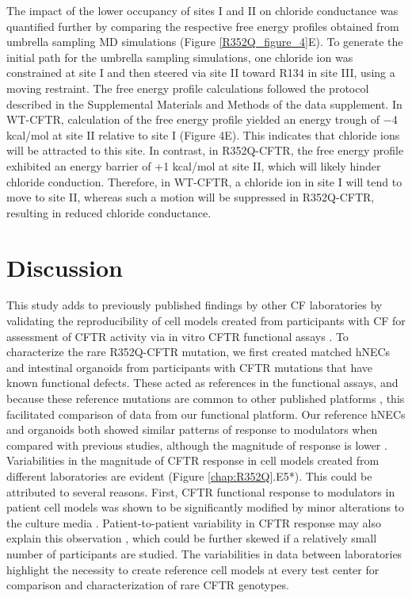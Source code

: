The impact of the lower occupancy of sites I and II on chloride conductance was quantified further by comparing the respective free energy profiles obtained from umbrella sampling MD simulations (Figure \ref{R352Q_figure_4}E). To generate the initial path for the umbrella sampling simulations, one chloride ion was constrained at site I and then steered via site II toward R134 in site III, using a moving restraint. The free energy profile calculations followed the protocol described in the Supplemental Materials and Methods of the data supplement. In WT-CFTR, calculation of the free energy profile yielded an energy trough of −4 kcal/mol at site II relative to site I (Figure 4E). This indicates that chloride ions will be attracted to this site. In contrast, in R352Q-CFTR, the free energy profile exhibited an energy barrier of +1 kcal/mol at site II, which will likely hinder chloride conduction. Therefore, in WT-CFTR, a chloride ion in site I will tend to move to site II, whereas such a motion will be suppressed in R352Q-CFTR, resulting in reduced chloride conductance.

\section{Discussion}
This study adds to previously published findings by other CF laboratories by validating the reproducibility of cell models created from participants with CF for assessment of CFTR activity via in vitro CFTR functional assays \cite{dekkers2016, ramalho2021}. To characterize the rare R352Q-CFTR mutation, we first created matched hNECs and intestinal organoids from participants with CFTR mutations that have known functional defects. These acted as references in the functional assays, and because these reference mutations are common to other published platforms \cite{dekkers2016, ramalho2021}, this facilitated comparison of data from our functional platform. Our reference hNECs and organoids both showed similar patterns of response to modulators when compared with previous studies, although the magnitude of response is lower \cite{dekkers2016, ramalho2021, pranke2017, pranke2019a}. Variabilities in the magnitude of CFTR response in cell models created from different laboratories are evident (Figure \ref{chap:R352Q}.E5*). This could be attributed to several reasons. First, CFTR functional response to modulators in patient cell models was shown to be significantly modified by minor alterations to the culture media \cite{gentzsch2017, saint-criq2020}. Patient-to-patient variability in CFTR response may also explain this observation \cite{pranke2017, matthes2018, brewington2018}, which could be further skewed if a relatively small number of participants are studied. The variabilities in data between laboratories highlight the necessity to create reference cell models at every test center for comparison and characterization of rare CFTR genotypes.

